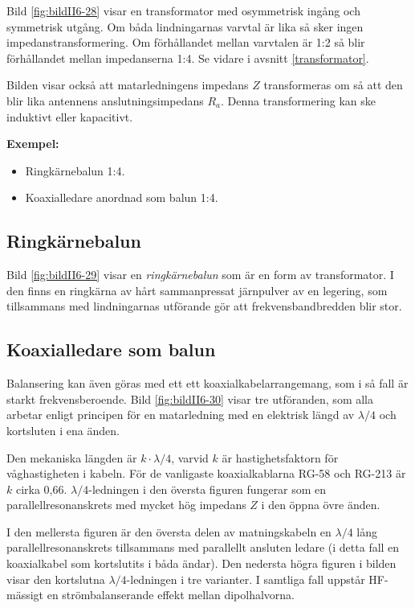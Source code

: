 Bild \ref{fig:bildII6-28} visar en transformator med osymmetrisk ingång och
symmetrisk utgång.
Om båda lindningarnas varvtal är lika så sker ingen impedanstransformering.
Om förhållandet mellan varvtalen är 1:2 så blir förhållandet mellan
impedanserna 1:4.
Se vidare i avsnitt \ref{transformator}.

Bilden visar också att matarledningens impedans \(Z\) transformeras om så
att den blir lika antennens anslutningsimpedans \(R_a\).
Denna transformering kan ske induktivt eller kapacitivt.

\noindent\textbf{Exempel:}
\begin{itemize}
\item Ringkärnebalun 1:4.
\item Koaxialledare anordnad som balun 1:4.
\end{itemize}

\subsection{Ringkärnebalun}

Bild \ref{fig:bildII6-29} visar en \emph{ringkärnebalun} som är en form av
transformator.
I den finns en ringkärna av hårt sammanpressat järnpulver av en legering, som
tillsammans med lindningarnas utförande gör att frekvensbandbredden blir stor.


\subsection{Koaxialledare som balun}

Balansering kan även göras med ett ett koaxialkabelarrangemang, som i
så fall är starkt frekvensberoende.
Bild \ref{fig:bildII6-30} visar tre utföranden, som alla arbetar enligt
principen för en matarledning med en elektrisk längd av \(\lambda/4\) och
kortsluten i ena änden.

Den mekaniska längden är \(k\cdot\lambda/4\), varvid \(k\) är hastighetsfaktorn
för våghastigheten i kabeln.
För de vanligaste koaxialkablarna RG-58 och RG-213 är \(k\) cirka 0,66.
\(\lambda/4\)-ledningen i den översta figuren fungerar som en
parallellresonanskrets med mycket hög impedans \(Z\) i den öppna övre änden.

I den mellersta figuren är den översta delen av matningskabeln en
\(\lambda/4\) lång parallellresonanskrets tillsammans med parallellt
ansluten ledare (i detta fall en koaxialkabel som kortslutits i båda ändar).
Den nedersta högra figuren i bilden visar den kortslutna
\(\lambda/4\)-ledningen i tre varianter.
I samtliga fall uppstår HF-mässigt en strömbalanserande effekt mellan
dipolhalvorna.

